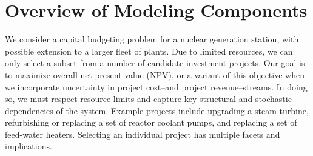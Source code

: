 \section{Overview of Modeling Components}
\label{sec:ModelingComponents}

We consider a capital budgeting problem for a nuclear generation station, with possible
extension to a larger fleet of plants. Due to limited resources, we can only select a
subset from a number of candidate investment projects. Our goal is to maximize overall net
present value (NPV), or a variant of this objective when we incorporate uncertainty in
project cost–and project revenue–streams. In doing so, we must respect resource limits
and capture key structural and stochastic dependencies of the system. Example projects
include upgrading a steam turbine, refurbishing or replacing a set of reactor coolant pumps,
and replacing a set of feed-water heaters. Selecting an individual project has multiple
facets and implications.

